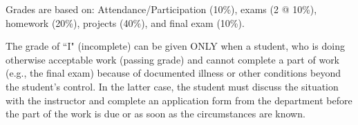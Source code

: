 
Grades are based on:
    Attendance/Participation (10\%), 
    exams (2 @ 10\%), 
    homework (20\%), 
    projects (40\%), and 
    final exam (10\%).   

The grade of ``I" (incomplete) can be given ONLY when a student, 
who is doing otherwise acceptable work (passing grade) and cannot 
complete a part of work (e.g., the final exam) because of documented 
illness or other conditions beyond the student’s control. 
In the latter case, the student must discuss the situation with the 
instructor and complete an application form from the department before 
the part of the work is due or as soon as the circumstances are known.
